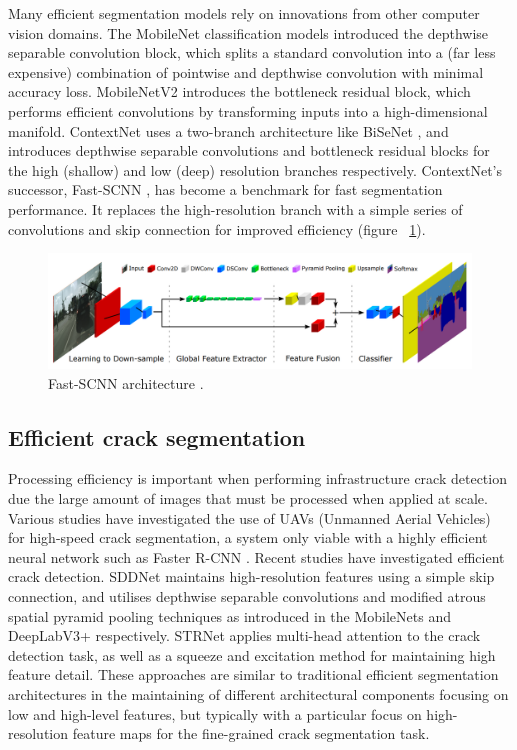 \documentclass[a4paper,12pt]{report}
\begin{document}
Many efficient segmentation models rely on innovations from other computer vision domains. The MobileNet \cite{howard_mobilenets_2017} classification models introduced the depthwise separable convolution block, which splits a standard convolution into a (far less expensive) combination of pointwise and depthwise convolution with minimal accuracy loss. MobileNetV2 \cite{sandler_mobilenetv2_2019} introduces the bottleneck residual block, which performs efficient convolutions by transforming inputs into a high-dimensional manifold. ContextNet \cite{poudel_contextnet_2018} uses a two-branch architecture like BiSeNet \cite{yu_bisenet_2018}, and introduces depthwise separable convolutions and bottleneck residual blocks for the high (shallow) and low (deep) resolution branches respectively. ContextNet’s successor, Fast-SCNN \cite{poudel_fast-scnn_2019}, has become a benchmark for fast segmentation performance. It replaces the high-resolution branch with a simple series of convolutions and skip connection for improved efficiency (figure ~\ref{fig:fastscnn_architecture}).

\begin{figure}[h]
    \centering
    \includegraphics[width=\textwidth]{res/fastscnn-architecture.png}
    \caption{Fast-SCNN architecture \cite{poudel_fast-scnn_2019}.}
    \label{fig:fastscnn_architecture}
\end{figure}

\subsection{Efficient crack segmentation}
Processing efficiency is important when performing infrastructure crack detection due the large amount of images that must be processed when applied at scale. Various studies \cite{kerle_uav-based_2020} \cite{kang_autonomous_2018} have investigated the use of UAVs (Unmanned Aerial Vehicles) for high-speed crack segmentation, a system only viable with a highly efficient neural network such as Faster R-CNN \cite{ali_real-time_2021}. Recent studies have investigated efficient crack detection. SDDNet \cite{choi_sddnet_2019} maintains high-resolution features using a simple skip connection, and utilises depthwise separable convolutions and modified atrous spatial pyramid pooling techniques as introduced in the MobileNets \cite{howard_mobilenets_2017} and DeepLabV3+ \cite{chen_rethinking_2017} respectively. STRNet \cite{kang_efficient_2021} applies multi-head attention to the crack detection task, as well as a squeeze and excitation method for maintaining high feature detail.
These approaches are similar to traditional efficient segmentation architectures in the maintaining of different architectural components focusing on low and high-level features, but typically with a particular focus on high-resolution feature maps for the fine-grained crack segmentation task.
\end{document}
